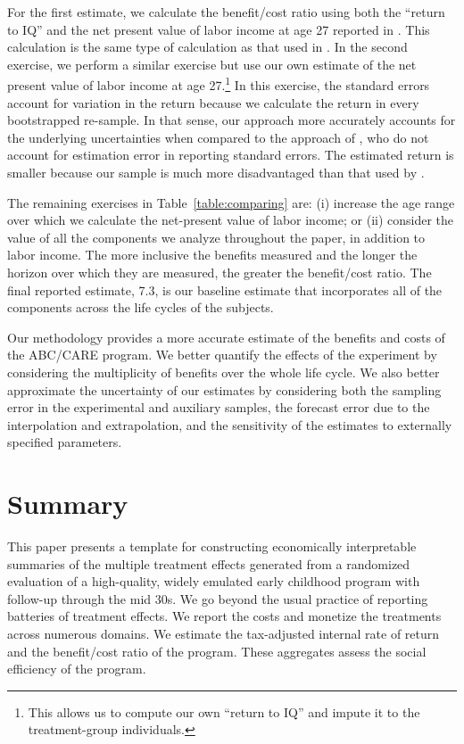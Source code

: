 For the first estimate, we calculate the benefit/cost ratio using both the ``return to IQ'' and the net present value of labor income at age 27 reported in \citet{Chetty_Friedman_etal_2011_QJoE}. This calculation is the same type of calculation as that used in \citet{Kline_Walters_2016_QJE}. In the second exercise, we perform a similar exercise but use our own estimate of the net present value of labor income at age 27.\footnote{This allows us to compute our own ``return to IQ'' and impute it to the treatment-group individuals.} In this exercise, the standard errors account for variation in the return because we calculate the return in every bootstrapped re-sample. In that sense, our approach more accurately accounts for the underlying uncertainties when compared to the approach of \citet{Kline_Walters_2016_QJE}, who do not account for estimation error in reporting standard errors. The estimated return is smaller because our sample is much more disadvantaged than that used by \citet{Chetty_Friedman_etal_2011_QJoE}.

The remaining exercises in Table~\ref{table:comparing} are: (i) increase the age range over which we calculate the net-present value of labor income; or (ii) consider the value of all the components we analyze throughout the paper, in addition to labor income. The more inclusive the benefits measured and the longer the horizon over which they are measured, the greater the benefit/cost ratio. The final reported estimate, 7.3, is our baseline estimate that incorporates all of the components across the life cycles of the subjects.

Our methodology provides a more accurate estimate of the benefits and costs of the ABC/CARE program. We better quantify the effects of the experiment by considering the multiplicity of benefits over the whole life cycle. We also better approximate the uncertainty of our estimates by considering both the sampling error in the experimental and auxiliary samples, the forecast error due to the interpolation and extrapolation, and the sensitivity of the estimates to externally specified parameters.

\section{Summary} \label{section:conclusion}

\noindent This paper presents a template for constructing economically interpretable summaries of the multiple treatment effects generated from a randomized evaluation of a high-quality, widely emulated early childhood program with follow-up through the mid 30s. We go beyond the usual practice of reporting batteries of treatment effects. We report the costs and monetize the treatments across numerous domains. We estimate the tax-adjusted internal rate of return and the benefit/cost ratio of the program. These aggregates assess the social efficiency of the program.


